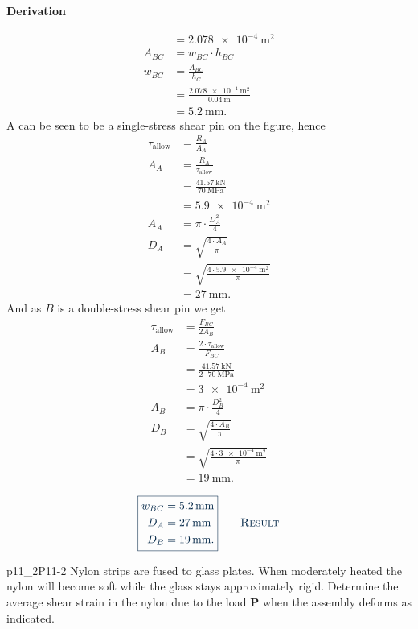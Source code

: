 \documentclass[a4paper]{article}
\renewcommand{\Vec}[1]{\boldsymbol{#1}}
\newcounter{problem}
\numberwithin{equation}{problem}
\newcommand{\AUheading}[1]{%
  \par\vspace{.4\baselineskip}%
  {\sffamily\bfseries\color{AUblueDark}#1\par}%
  \nobreak%
}
\newenvironment{derivation}[1][Derivation]{%
  \AUheading{#1}
  \begingroup\allowdisplaybreaks
  \setlength{\abovedisplayskip}{6pt}%
  \setlength{\belowdisplayskip}{6pt}%
  \setlength{\abovedisplayshortskip}{4pt}%
  \setlength{\belowdisplayshortskip}{4pt}%
}{\par\endgroup\medskip}
\newcommand{\finalresult}[1]{%
  \vspace{.2\baselineskip}%
  \begin{equation}
    {\color{AUblueDark}\boxed{\displaystyle #1}}
    \tag*{\textsc{\textcolor{AUblueDark}{Result}}}
  \end{equation}
  \newpage
}
\begin{document}
\begin{derivation}
\begin{align*}
    &= \qty{2,078e-4}{\m\squared} \\
    A_{BC} &= w_{BC} \cdot h_{BC} \\
    w_{BC} &= \frac{A_{BC}}{h_{C}} \\
      &= \frac{\qty{2,078e-4}{\m\squared }}{\qty{0,04}{\m}} \\
      &= \qty{5,2}{\mm}
  .\end{align*}
  A can be seen to be a single-stress shear pin on the figure, hence
  \begin{align*}
    \tau_{\text{allow}} &= \frac{R_A}{A_{A}} \\
    A_{A} &= \frac{R_A}{\tau_{\text{allow}}} \\
    &= \frac{\qty{41,57}{\kN}}{\qty{70}{\MPa} } \\
    &= \qty{5,9e-4}{\square\m} \\
    A_{A} &= \pi \cdot \frac{D_A^2}{4} \\
    D_{A} &= \sqrt{\frac{4 \cdot A_{A}}{\pi}} \\
          &= \sqrt{\frac{4 \cdot \qty{5,9e-4}{\square\m}  }{\pi}} \\
          &= \qty{27}{\mm} 
  .\end{align*}
  And as $B$ is a double-stress shear pin we get
  \begin{align*}
    \tau_{\text{allow}} &= \frac{F_{BC}}{2 A_{B}} \\
    A_B &= \frac{2 \cdot \tau_{\text{allow}}}{F_{BC}} \\
        &= \frac{\qty{41,57}{\kN}}{2 \cdot \qty{70}{\MPa} } \\
    &=   \qty{3e-4}{\m\squared} \\
    A_{B} &= \pi \cdot \frac{D_B^2}{4}  \\
    D_B &= \sqrt{\frac{4 \cdot A_B}{\pi}} \\
    &= \sqrt{\frac{4 \cdot \qty{3e-4}{\m\squared} }{\pi}} \\
    &= \qty{19}{\mm} 
  .\end{align*}
\end{derivation}

\finalresult{
  \begin{aligned}
    w_{BC} &= \qty{5,2}{\mm} \\
    D_A &= \qty{27}{\mm}  \\
    D_B &= \qty{19}{\mm}
  .\end{aligned}
}

\begin{problemwithimage}{p11_2}{P11-2}
  Nylon strips are fused to glass plates. When moderately heated the nylon will become soft while the glass stays approximately rigid. Determine the average shear strain in the nylon due to the load $\Vec{P}$ when the assembly deforms as indicated.
\end{problemwithimage}
\end{document}
